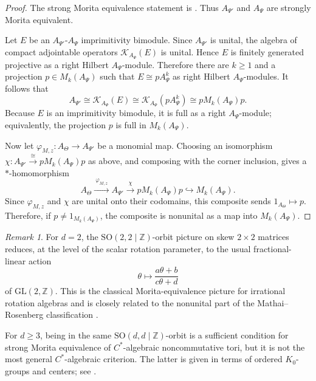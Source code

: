 \documentclass[11pt]{amsart}
\theoremstyle{definition}
\theoremstyle{remark}
\newtheorem{remark}[theorem]{Remark}
\newcommand{\Z}{\mathbb{Z}}
\newcommand{\GL}{\mathrm{GL}}
\newcommand{\SO}{\mathrm{SO}}
\begin{document}
\begin{proof}
The strong Morita equivalence statement is \cite[Theorem~1.1]{LiStrongMorita}.
Thus $A_{\Psi'}$ and $A_\Psi$ are strongly Morita equivalent.

Let $E$ be an $A_{\Psi'}$-$A_\Psi$ imprimitivity bimodule. Since
$A_{\Psi'}$ is unital, the algebra of compact adjointable operators
$\mathcal K_{A_\Psi}(E)$ is unital. Hence $E$ is finitely generated
projective as a right Hilbert $A_\Psi$-module. Therefore there are
$k\geq 1$ and a projection $p\in M_k(A_\Psi)$
such that $E\cong pA_\Psi^k$
as right Hilbert $A_\Psi$-modules. It follows that
\[
A_{\Psi'}
\cong
\mathcal K_{A_\Psi}(E)
\cong
\mathcal K_{A_\Psi}(pA_\Psi^k)
\cong
pM_k(A_\Psi)p.
\]
Because $E$ is an imprimitivity bimodule, it is full as a right
$A_\Psi$-module; equivalently, the projection $p$ is full in
$M_k(A_\Psi)$.

Now let $\varphi_{M,z}\colon A_\Theta\to A_{\Psi'}$
be a monomial map. Choosing an isomorphism $\chi\colon A_{\Psi'}\xrightarrow{\cong}pM_k(A_\Psi)p$
as above, and composing with the corner inclusion, gives a
$*$-homomorphism
\[
A_\Theta
\xrightarrow{\ \varphi_{M,z}\ }
A_{\Psi'}
\xrightarrow{\ \chi\ }
pM_k(A_\Psi)p
\hookrightarrow
M_k(A_\Psi).
\]
Since $\varphi_{M,z}$ and $\chi$ are unital onto their codomains, this
composite sends $1_{A_\Theta}\mapsto
p.$
Therefore, if $p\neq 1_{M_k(A_\Psi)}$, the composite is nonunital as a map
into $M_k(A_\Psi)$.
\end{proof}

\begin{remark}
For $d=2$, the $\SO(2,2\mid\Z)$-orbit picture on skew $2\times2$
matrices reduces, at the level of the scalar rotation parameter, to the usual
fractional-linear action
\[
\theta\longmapsto \frac{a\theta+b}{c\theta+d}
\]
of $\GL(2,\Z)$. This is the classical Morita-equivalence picture for
irrational rotation algebras and is closely related to the nonunital part of
the Mathai--Rosenberg classification \cite[Theorem~2.7]{MathaiRosenberg}.

For $d\geq3$, being in the same $\SO(d,d\mid\Z)$-orbit is a sufficient
condition for strong Morita equivalence of $C^*$-algebraic noncommutative
tori, but it is not the most general $C^*$-algebraic criterion. The latter is
given in terms of ordered $K_0$-groups and centers; see
\cite[Theorem~1.1]{EllLiII}.
\end{remark}
\end{document}
